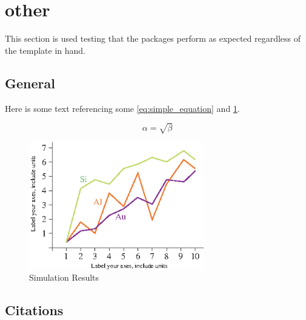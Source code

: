 \graphicspath{ {./content/other/figures/} }

\section{other}
\label{sec:other}  %

This section is used testing that the packages perform as expected regardless of the template in hand.

\subsection{General}
\label{sec:other:general}
Here is some text referencing some \cref{eq:simple_equation} and \cref{fig:simulationfigure}.

\begin{equation}
    \label{eq:simple_equation}
    \alpha = \sqrt{ \beta }
\end{equation}

\begin{figure}
    \centering
    \includegraphics[width=3.0in]{fig_1}
    \caption{Simulation Results}
    \label{fig:simulationfigure}
\end{figure}

\subsection{Citations}
\label{sec:other:citations}





